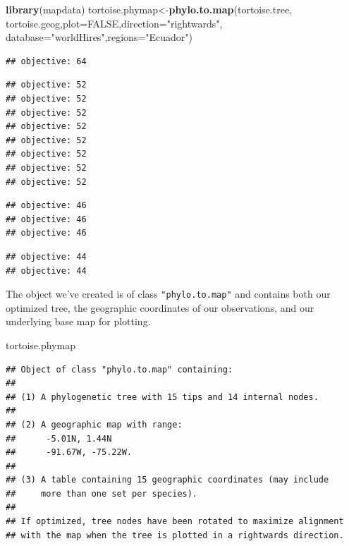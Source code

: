 \documentclass[fleqn,10pt,lineno]{wlpeerj} %
\newenvironment{Shaded}{\begin{snugshade}}{\end{snugshade}}
\newcommand{\AttributeTok}[1]{\textcolor[rgb]{0.13,0.29,0.53}{#1}}
\newcommand{\ConstantTok}[1]{\textcolor[rgb]{0.56,0.35,0.01}{#1}}
\newcommand{\FunctionTok}[1]{\textcolor[rgb]{0.13,0.29,0.53}{\textbf{#1}}}
\newcommand{\NormalTok}[1]{#1}
\newcommand{\OtherTok}[1]{\textcolor[rgb]{0.56,0.35,0.01}{#1}}
\newcommand{\StringTok}[1]{\textcolor[rgb]{0.31,0.60,0.02}{#1}}
\begin{document}
\begin{Shaded}
\begin{Highlighting}[]
\FunctionTok{library}\NormalTok{(mapdata)}
\NormalTok{tortoise.phymap}\OtherTok{\textless{}{-}}\FunctionTok{phylo.to.map}\NormalTok{(tortoise.tree,}
\NormalTok{  tortoise.geog,}\AttributeTok{plot=}\ConstantTok{FALSE}\NormalTok{,}\AttributeTok{direction=}\StringTok{"rightwards"}\NormalTok{,}
  \AttributeTok{database=}\StringTok{"worldHires"}\NormalTok{,}\AttributeTok{regions=}\StringTok{"Ecuador"}\NormalTok{)}
\end{Highlighting}
\end{Shaded}

\begin{verbatim}
## objective: 64
\end{verbatim}

\begin{verbatim}
## objective: 52
## objective: 52
## objective: 52
## objective: 52
## objective: 52
## objective: 52
## objective: 52
## objective: 52
\end{verbatim}

\begin{verbatim}
## objective: 46
## objective: 46
## objective: 46
\end{verbatim}

\begin{verbatim}
## objective: 44
## objective: 44
\end{verbatim}

The object we've created is of class \texttt{"phylo.to.map"} and contains both our optimized tree, the geographic coordinates of our observations, and our underlying base map for plotting.

\begin{Shaded}
\begin{Highlighting}[]
\NormalTok{tortoise.phymap}
\end{Highlighting}
\end{Shaded}

\begin{verbatim}
## Object of class "phylo.to.map" containing:
## 
## (1) A phylogenetic tree with 15 tips and 14 internal nodes.
## 
## (2) A geographic map with range:
##      -5.01N, 1.44N
##      -91.67W, -75.22W.
## 
## (3) A table containing 15 geographic coordinates (may include
##     more than one set per species).
## 
## If optimized, tree nodes have been rotated to maximize alignment
## with the map when the tree is plotted in a rightwards direction.
\end{verbatim}
\end{document}
